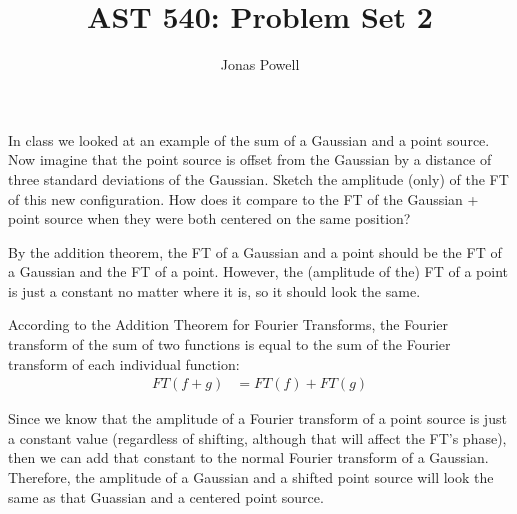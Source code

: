 \documentclass[12pt]{article}
\newenvironment{answer}[2][Answer]{\begin{trivlist}
\item[\hskip \labelsep {\bfseries #1}\hskip \labelsep {\bfseries #2.}]}{\end{trivlist}}
\newenvironment{warmup}[2][Warm Up]{\begin{trivlist}
\item[\hskip \labelsep {\bfseries #1}\hskip \labelsep {\bfseries #2.}]}{\end{trivlist}}
\begin{document}

\title{AST 540: Problem Set 2}
\author{Jonas Powell}
\maketitle

\begin{warmup}{1}
  In class we looked at an example of the sum of a Gaussian and a point source. Now imagine that the point source is offset from the Gaussian by a distance of three standard deviations of the Gaussian. Sketch the amplitude (only) of the FT of this new configuration. How does it compare to the FT of the Gaussian + point source when they were both centered on the same position?
\end{warmup}
\begin{answer}{Warm Up 1}
By the addition theorem, the FT of a Gaussian and a point should be the FT of a Gaussian and the FT of a point. However, the (amplitude of the) FT of a point is just a constant no matter where it is, so it should look the same.

According to the Addition Theorem for Fourier Transforms, the Fourier transform of the sum of two functions is equal to the sum of the Fourier transform of each individual function:
\begin{align*}
  FT \left( f + g \right) &= FT \left( f \right) + FT \left( g \right)
\end{align*}

Since we know that the amplitude of a Fourier transform of a point source is just a constant value (regardless of shifting, although that will affect the FT's phase), then we can add that constant to the normal Fourier transform of a Gaussian. Therefore, the amplitude of a Gaussian and a shifted point source will look the same as that Guassian and a centered point source.


\end{answer}


\bigskip
\bigskip
\end{document}
